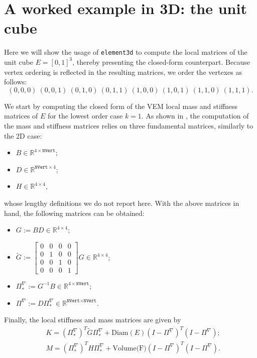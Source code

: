 \documentclass[a4paper]{article}
\begin{document}
\section{A worked example in 3D: the unit cube}
Here we will show the usage of \texttt{element3d} to compute the local matrices of the unit cube $E = [0,1]^3$, thereby presenting the closed-form counterpart.  Because vertex ordering is reflected in the resulting matrices, we order the vertexes as follows:
\begin{equation}
\label{cube_vertex_ordering}
(0, 0,0)\ 
(0,0, 1)\ 
(0,1, 0)\ 
(0, 1,1)\ 
(1 ,0,0)\ 
(1 ,0,1)\ 
(1 ,1,0)\ 
(1 ,1,1).
\end{equation}

\noindent
We start by computing the closed form of the VEM local mass and stiffness matrices of $E$ for the lowest order case $k=1$.  As shown in \cite{hitchhikers}, the computation of the mass and stiffness matrices relies on three fundamental matrices, similarly to the 2D case:
\begin{itemize}
\item $B \in \mathbb{R}^{4\times\texttt{NVert}}$;
\item $D \in \mathbb{R}^{\texttt{NVert} \times 4}$;
\item $H \in\mathbb{R}^{4\times 4}$,
\end{itemize}
whose lengthy definitions we do not report here. With the above matrices in hand, the following matrices can be obtained:
\begin{itemize}
\item $G := BD \in\mathbb{R}^{4\times 4}$;
\item $\widetilde{G} := \left[\begin{array}{cccc}
0 & 0 & 0 & 0\\ 0 & 1 & 0 & 0\\ 0 & 0 & 1 & 0\\ 0 & 0 & 0 & 1
\end{array}\right] G \in\mathbb{R}^{4\times 4}$;
\item $\Pi^\nabla_* := G^{-1}B \in \mathbb{R}^{4\times\texttt{NVert}}$;
\item $\Pi^\nabla := D\Pi^\nabla_* \in \mathbb{R}^{\texttt{NVert}\times\texttt{NVert}}$.
\end{itemize}

\noindent
Finally, the local stiffness and mass matrices are given by
\begin{align}
&K = (\Pi^\nabla_*)^T \widetilde{G} \Pi^\nabla_* + \text{Diam}(E)(I-\Pi^\nabla)^T(I-\Pi^\nabla);\\
&M = (\Pi^\nabla_*)^T H \Pi^\nabla_* + \text{Volume(F)}(I-\Pi^\nabla)^T(I-\Pi^\nabla).
\end{align}
\end{document}
